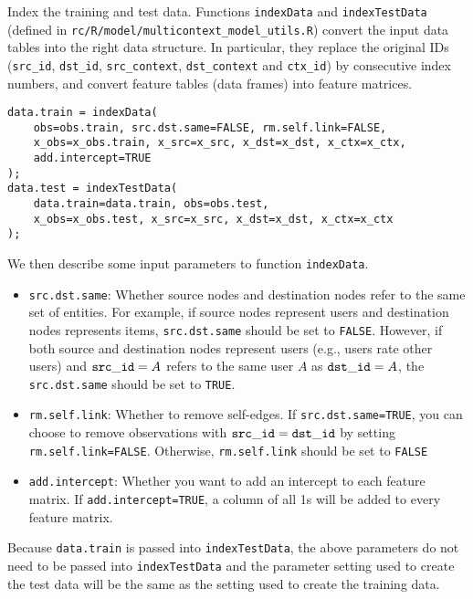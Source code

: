 \documentclass[10pt]{article}
\begin{document}
Index the training and test data.  Functions {\tt indexData} and {\tt indexTestData} (defined in {\tt rc/R/model/multicontext\_model\_utils.R}) convert the input data tables into the right data structure.  In particular, they replace the original IDs ({\tt src\_id}, {\tt dst\_id}, {\tt src\_context}, {\tt dst\_context} and {\tt ctx\_id}) by consecutive index numbers, and convert feature tables (data frames) into feature matrices.
{\small\begin{verbatim}
data.train = indexData(
    obs=obs.train, src.dst.same=FALSE, rm.self.link=FALSE,
    x_obs=x_obs.train, x_src=x_src, x_dst=x_dst, x_ctx=x_ctx,
    add.intercept=TRUE
);
data.test = indexTestData(
    data.train=data.train, obs=obs.test,
    x_obs=x_obs.test, x_src=x_src, x_dst=x_dst, x_ctx=x_ctx
);
\end{verbatim}}
\noindent We then describe some input parameters to function {\tt indexData}.
\begin{itemize}
\item {\tt src.dst.same}: Whether source nodes and destination nodes refer to the same set of entities.  For example, if source nodes represent users and destination nodes represents items, {\tt src.dst.same} should be set to {\tt FALSE}.  However, if both source and destination nodes represent users (e.g., users rate other users) and ${\tt src\_id} = A$ refers to the same user $A$ as ${\tt dst\_id} = A$, the {\tt src.dst.same} should be set to {\tt TRUE}.
\item {\tt rm.self.link}: Whether to remove self-edges.  If {\tt src.dst.same=TRUE}, you can choose to remove observations with ${\tt src\_id} = {\tt dst\_id}$ by setting {\tt rm.self.link=FALSE}.  Otherwise, {\tt rm.self.link} should be set to {\tt FALSE}
\item {\tt add.intercept}: Whether you want to add an intercept to each feature matrix.  If {\tt add.intercept=TRUE}, a column of all 1s will be added to every feature matrix.
\end{itemize}
Because {\tt data.train} is passed into {\tt indexTestData}, the above parameters do not need to be passed into {\tt indexTestData} and the parameter setting used to create the test data will be the same as the setting used to create the training data.
\end{document}
